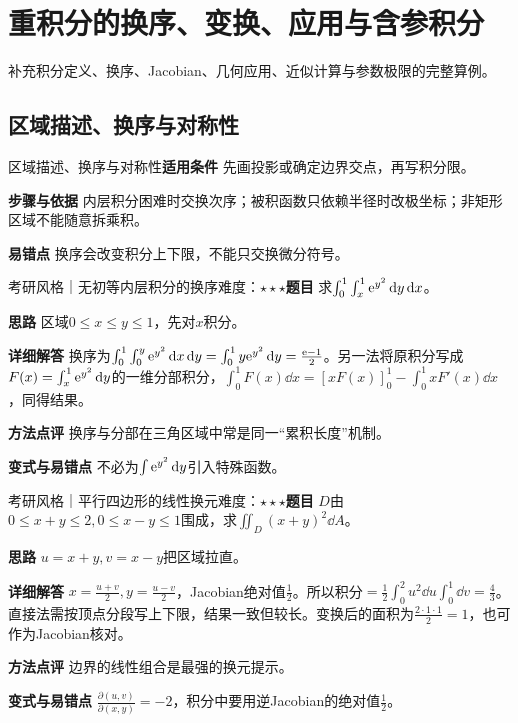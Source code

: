 \section{重积分的换序、变换、应用与含参积分}\label{deep:multiple_source_deep}

\begin{examtip}补充积分定义、换序、Jacobian、几何应用、近似计算与参数极限的完整算例。\end{examtip}

\subsection{区域描述、换序与对称性}\label{deep:multiple_source_deep:region}

\begin{method}{区域描述、换序与对称性}\textbf{适用条件} 先画投影或确定边界交点，再写积分限。\par\textbf{步骤与依据} 内层积分困难时交换次序；被积函数只依赖半径时改极坐标；非矩形区域不能随意拆乘积。\par\textbf{易错点} 换序会改变积分上下限，不能只交换微分符号。\end{method}

\begin{example}{考研风格｜无初等内层积分的换序}{难度：$\star\star\star$}\label{deep:ex:multiple_source_deep:order}\textbf{题目} 求$\int_0^1\int_x^1\mathrm{e}^{y^2}\mathop{}\!\mathrm{d} y\mathop{}\!\mathrm{d} x$。\par\textbf{思路} 区域$0\le x\le y\le1$，先对$x$积分。\par\textbf{详细解答} 换序为$\int_0^1\int_0^y\mathrm{e}^{y^2}\mathop{}\!\mathrm{d} x\mathop{}\!\mathrm{d} y=\int_0^1y\mathrm{e}^{y^2}\mathop{}\!\mathrm{d} y=\frac{\mathrm{e}-1}{2}$。另一法将原积分写成$F(x)=\int_x^1\mathrm{e}^{y^2}\mathop{}\!\mathrm{d} y$的一维分部积分，$\int_0^1F(x)\dd x=[xF(x)]_0^1-\int_0^1xF'(x)\dd x$，同得结果。\par\textbf{方法点评} 换序与分部在三角区域中常是同一“累积长度”机制。\par\textbf{变式与易错点} 不必为$\int\mathrm{e}^{y^2}\mathop{}\!\mathrm{d} y$引入特殊函数。\end{example}

\begin{example}{考研风格｜平行四边形的线性换元}{难度：$\star\star\star$}\label{deep:ex:multiple_source_deep:linearjac}\textbf{题目} $D$由$0\le x+y\le2,0\le x-y\le1$围成，求$\iint_D(x+y)^2\dd A$。\par\textbf{思路} $u=x+y,v=x-y$把区域拉直。\par\textbf{详细解答} $x=\frac{u+v}{2},y=\frac{u-v}{2}$，Jacobian绝对值$\frac{1}{2}$。所以积分$=\frac12\int_0^2u^2\dd u\int_0^1\dd v=\frac{4}{3}$。直接法需按顶点分段写上下限，结果一致但较长。变换后的面积为$\frac{2\cdot1\cdot1}{2}=1$，也可作为Jacobian核对。\par\textbf{方法点评} 边界的线性组合是最强的换元提示。\par\textbf{变式与易错点} $\frac{\partial(u,v)}{\partial(x,y)}=-2$，积分中要用逆Jacobian的绝对值$\frac{1}{2}$。\end{example}

